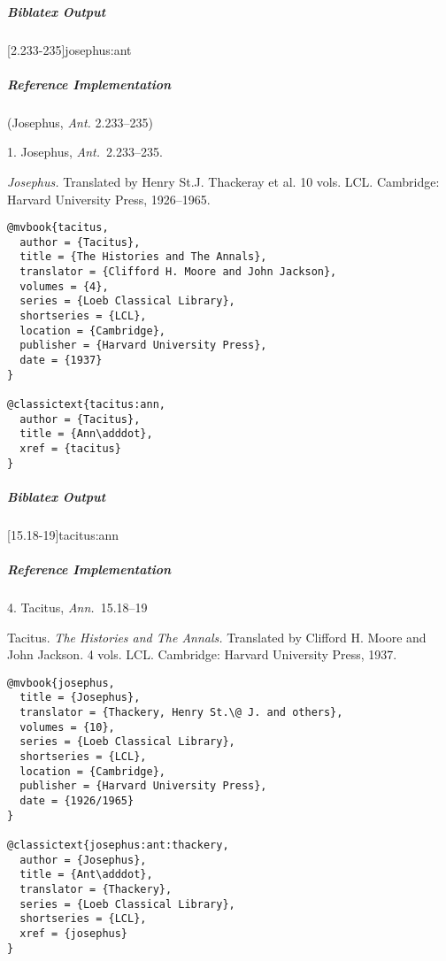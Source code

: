 \documentclass[a4paper]{article}
\newenvironment{biboutput}{%
  \subparagraph{Biblatex Output}
}{\color{black}}
\newenvironment{refimp}{%
  \subparagraph{Reference Implementation}
  \color{reference-colour}
  \rm
}{\par\color{black}}
\begin{document}
\begin{biboutput}
  [2.233-235]{josephus:ant}
\end{biboutput}

\begin{refimp}
  (Josephus, \emph{Ant.} 2.233–235)

  \hspace*{\bibindent}1. Josephus, \emph{Ant.}\ 2.233–235.

  \hangindent\bibindent \emph{Josephus.} Translated by Henry St.\@ J.
  Thackeray et al. 10 vols. LCL. Cambridge: Harvard University Press,
  1926–1965.

\end{refimp}

\medskip

\begin{lstlisting}
@mvbook{tacitus,
  author = {Tacitus},
  title = {The Histories and The Annals},
  translator = {Clifford H. Moore and John Jackson},
  volumes = {4},
  series = {Loeb Classical Library},
  shortseries = {LCL},
  location = {Cambridge},
  publisher = {Harvard University Press},
  date = {1937}
}

@classictext{tacitus:ann,
  author = {Tacitus},
  title = {Ann\adddot},
  xref = {tacitus}
}
\end{lstlisting}

\begin{biboutput}
  [15.18-19]{tacitus:ann}
\end{biboutput}

\begin{refimp}
  \hspace*{\bibindent}4. Tacitus, \emph{Ann.}\ 15.18–19

  \hangindent\bibindent Tacitus. \emph{The Histories and The Annals.}
  Translated by Clifford H. Moore and John Jackson. 4 vols. LCL. Cambridge:
  Harvard University Press, 1937.

\end{refimp}

\medskip

\begin{lstlisting}
@mvbook{josephus,
  title = {Josephus},
  translator = {Thackery, Henry St.\@ J. and others},
  volumes = {10},
  series = {Loeb Classical Library},
  shortseries = {LCL},
  location = {Cambridge},
  publisher = {Harvard University Press},
  date = {1926/1965}
}

@classictext{josephus:ant:thackery,
  author = {Josephus},
  title = {Ant\adddot},
  translator = {Thackery},
  series = {Loeb Classical Library},
  shortseries = {LCL},
  xref = {josephus}
}
\end{lstlisting}
\end{document}
